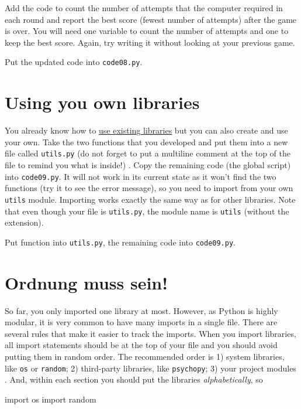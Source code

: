 \documentclass[
]{book}
\newenvironment{Shaded}{\begin{snugshade}}{\end{snugshade}}
\newcommand{\ImportTok}[1]{#1}
\newcommand{\NormalTok}[1]{#1}
\begin{document}
Add the code to count the number of attempts that the computer required in each round and
report the best score (fewest number of attempts) after the game is over. You will need one variable to count the number of attempts and one to keep the best score. Again, try writing it without looking at your previous game.

Put the updated code into \texttt{code08.py}.

\hypertarget{using-you-own-libraries}{%
\section{Using you own libraries}\label{using-you-own-libraries}}

You already know how to \protect\hyperlink{using-libraries}{use existing libraries} but you can also create and use your own. Take the two functions that you developed and put them into a new file called \texttt{utils.py} (do not forget to put a multiline comment at the top of the file to remind you what is inside!) . Copy the remaining code (the global script) into \texttt{code09.py}. It will not work in its current state as it won't find the two functions (try it to see the error message), so you need to import from your own \texttt{utils} module. Importing works exactly the same way as for other libraries. Note that even though your file is \texttt{utils.py}, the module name is \texttt{utils} (without the extension).

Put function into \texttt{utils.py}, the remaining code into \texttt{code09.py}.

\hypertarget{keep-imports-tidy}{%
\section{Ordnung muss sein!}\label{keep-imports-tidy}}

So far, you only imported one library at most. However, as Python is highly modular, it is very common to have many imports in a single file. There are several rules that make it easier to track the imports. When you import libraries, all import statements should be at the top of your file and you should avoid putting them in random order. The recommended order is 1) system libraries, like \texttt{os} or \texttt{random}; 2) third-party libraries, like \texttt{psychopy}; 3) your project modules . And, within each section you should put the libraries \emph{alphabetically}, so

\begin{Shaded}
\begin{Highlighting}[]
\ImportTok{import}\NormalTok{ os}
\ImportTok{import}\NormalTok{ random}
\end{Highlighting}
\end{Shaded}
\end{document}

